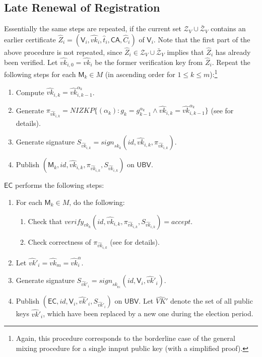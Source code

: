 \documentclass[bibtotoc,halfparskip,oneside]{scrreprt}
\newcommand{\eid}{\mathit{id}\xspace}
\newcommand{\sk}[1]{\mathit{sk}_{#1}\xspace}
\newcommand{\vk}[1]{\mathit{vk}_{#1}\xspace}
\newcommand{\vkhat}[1]{\hat{\mathit{vk}}_{#1}\xspace}
\newcommand{\vkhatprime}[1]{\hat{\mathit{vk}}'_{#1}\xspace}
\newcommand{\SK}[1]{\sk{_#1}\xspace}
\newcommand{\CA}{\ensuremath{\mathsf{CA}}\xspace}
\newcommand{\EC}{\ensuremath{\mathsf{EC}}\xspace}
\newcommand{\UBV}{\ensuremath{\mathsf{UBV}}\xspace}
\newcommand{\Mixer}[1]{\ensuremath{\mathsf{M}_{#1}}\xspace}
\newcommand{\Voter}[1]{\ensuremath{\mathsf{V}_{#1}}\xspace}
\begin{document}
\subsection{Late Renewal of Registration}

Essentially the same steps are repeated, if the current set $\mathcal{Z}_V \cup \bar{\mathcal{Z}}_V$ contains an earlier certificate $\hat{Z}_i=(\Voter{i},\vkhat{i},\hat{t}_i,\CA,\hat{C}_i)$ of $\Voter{i}$. Note that the first part of the above procedure is not repeated, since $\hat{Z}_i\in\mathcal{Z}_V \cup \bar{\mathcal{Z}}_V$ implies that $\hat{Z}_i$ has already been verified. Let $\vkhat{i,0}=\vkhat{i}$ be the former verification key from $\hat{Z}_i$. Repeat the following steps for each $\Mixer{k}\in M$ (in ascending order for $1\leq k\leq m$):\footnote{Again, this procedure corresponds to the borderline case of the general mixing procedure for a single innput public key (with a simplified proof).}

\begin{enumerate}
	\item Compute $\vkhat{i,k}=\vkhat{i,k-1}^{\alpha_k}$.
\	\item Generate $\pi_{\vkhat{i,k}}=\mathit{NIZKP}\{(\alpha_k):g_k=g_{k-1}^{\alpha_k}\wedge\vkhat{i,k}=\vkhat{i,k-1}^{\alpha_k}\}$ (see  for details).
	\item Generate signature $S_{\vkhat{i,k}}=\mathit{sign}_{\sk{k}}(\eid,\vkhat{i,k},\pi_{\vkhat{i,k}})$.
	\item Publish $(\Mixer{k},\eid,\vkhat{i,k},\pi_{\vkhat{i,k}},S_{\vkhat{i,k}})$ on \UBV.
\end{enumerate}

\EC performs the following steps:
\begin{enumerate}[resume]
	\item For each $\Mixer{k}\in M$, do the following:
	\begin{enumerate}
		\item Check that $\mathit{verify}_{\vk{k}}(\eid,\vkhat{i,k},\pi_{\vkhat{i,k}},S_{\vkhat{i,k}})=\mathit{accept}$.
		\item Check correctness of $\pi_{\vkhat{i,k}}$ (see  for details).
	\end{enumerate}
	\item Let $\vkhatprime{i}=\vkhat{m}=\vkhat{i}^{\alpha}$.
	\item Generate signature $S_{\vkhatprime{i}}=\mathit{sign}_{\SK{\EC}}(\eid,\Voter{i},\vkhatprime{i})$.
	\item Publish $(\EC,\eid,\Voter{i},\vkhatprime{i},S_{\vkhatprime{i}})$ on \UBV. Let $\hat{\mathit{VK}}'$ denote the set of all public keys $\vkhatprime{i}$, which have been replaced by a new one during the election period.
\end{enumerate}
\end{document}
